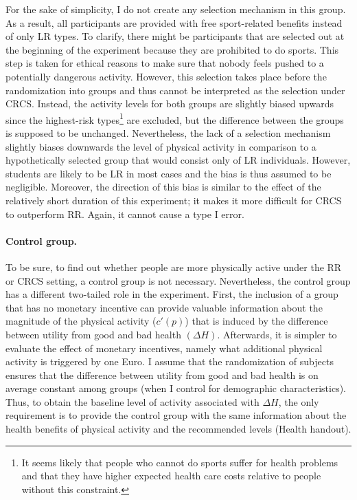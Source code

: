 \documentclass[12pt,english]{article}%
\begin{document}
For the sake of simplicity, I do not create any selection mechanism in this group. As a result, all participants are provided with free sport-related benefits instead of only LR types. To clarify, there might be participants that are selected out at the beginning of the experiment because they are prohibited to do sports. This step is taken for ethical reasons to make sure that nobody feels pushed to a potentially dangerous activity. However, this selection takes place before the randomization into groups and thus cannot be interpreted as the selection under CRCS. Instead, the activity levels for both groups are slightly biased upwards since the highest-risk types\footnote{ It seems likely that people who cannot do sports suffer for health problems and that they have higher expected health care costs relative to people without this constraint.} are excluded, but the difference between the groups is supposed to be unchanged. Nevertheless, the lack of a selection mechanism slightly biases downwards the level of physical activity in comparison to a hypothetically selected group that would consist only of LR individuals. However, students are likely to be LR in most cases and the bias is thus assumed to be negligible. Moreover, the direction of this bias is similar to the effect of the relatively short duration of this experiment; it makes it more difficult for CRCS to outperform RR. Again, it cannot cause a type I error.  

\paragraph{Control group.}  To be sure, to find out whether people are more physically active under the RR or CRCS setting, a control group is not necessary. Nevertheless, the control group has a different two-tailed role in the experiment. First, the inclusion of a group that has no monetary incentive can provide valuable information about the magnitude of the physical activity ($c'(p)$) that is induced by the difference between utility from good and bad health $(\Delta{H})$. Afterwards, it is simpler to evaluate the effect of monetary incentives, namely what additional physical activity is triggered by one Euro. I assume that the randomization of subjects ensures that the difference between utility from good and bad health is on average constant among groups (when I control for demographic characteristics). Thus, to obtain the baseline level of activity associated with $\Delta{H}$, the only requirement is to provide the control group with the same information about the health benefits of physical activity and the recommended levels (Health handout).
\end{document}
